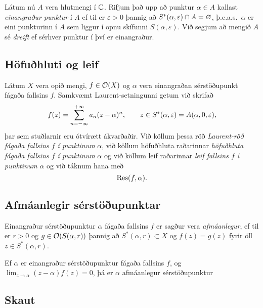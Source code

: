 Látum nú $A$ vera hlutmengi í ${\mathbb C}$.  Rifjum það upp að punktur
$\alpha\in A$ kallast {\it einangraður punktur} í $A$ ef til er
$\varepsilon>0$ þannig að $S\sp *(\alpha,\varepsilon)\cap A=\varnothing$,
þ.e.a.s.~$\alpha$ er eini punkturinn í $A$ sem liggur í opnu skífunni
$S(\alpha,\varepsilon)$. Við segjum að mengið $A$ sé
{\it dreift} ef sérhver
punktur í því er einangraður. 


\subsection*{Höfuðhluti og leif}

Látum $X$ vera opið mengi,
$f\in {\cal O}(X)$ og $\alpha$ vera einangraðan sér\-stöðu\-punkt  fágaða
fallsins $f$. Samkvæmt Laurent-setningunni getum við skrifað 
$$
f(z)= \sum_{n=-\infty}\sp{+\infty}a_n(z-\alpha)\sp n, \qquad z\in 
S\sp *(\alpha,\varepsilon)=A(\alpha,0,\varepsilon),
$$
þar sem stuðlarnir eru ótvírætt ákvarðaðir.  Við köllum þessa röð
{\it Laurent-röð fágaða fallsins
$f$ í punktinum}
$\alpha$, við köllum höfuðhluta raðarinnar {\it höfuðhluta  fágaða
fallsins $f$ í punktinum} $\alpha$ og
við köllum leif raðarinnar {\it leif fallsins
 $f$ í punktinum} $\alpha$
og við táknum hana með
$$ {\operatorname{Res}} (f,\alpha). $$


\subsection*{Afmáanlegir sérstöðupunktar}

Einangraður
sérstöðupunktur ${\alpha}$ fágaða fallsins $f$ 
er sagður vera {\it afmáanlegur},
ef til er $r>0$ og $g\in {\cal O}(S({\alpha},r))$ þannig að
$S^*({\alpha},r)\subset X$ og $f(z)=g(z)$ fyrir öll
$z\in S^*({\alpha},r)$.


\begin{se}
Ef $\alpha$ er einangraður sérstöðupunktur fágaða
fallsins $f$, og  $\lim_{z\to \alpha}(z-\alpha)f(z)= 0$,
þá er $\alpha$ afmáanlegur sérstöðupunktur
\end{se}


\subsection*{Skaut}


